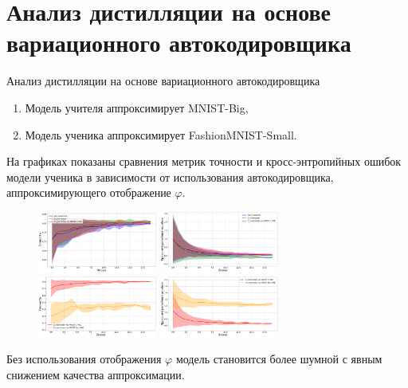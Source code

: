 \documentclass[10pt,pdf,hyperref={unicode}]{beamer}
\begin{document}
\section{Анализ дистилляции на основе вариационного автокодировщика}
\begin{frame}{Анализ дистилляции на основе вариационного автокодировщика}
\justifying
\begin{enumerate}[1)]
    \item Модель учителя аппроксимирует MNIST-Big,
    \item Модель ученика аппроксимирует FashionMNIST-Small.
\end{enumerate}

\par
На графиках показаны сравнения метрик точности и кросс-энтропийных ошибок модели ученика в зависимости от использования автокодировщика, аппроксимирующего отображение $\varphi$.

\begin{figure}[h!]
\includegraphics[width=0.35\textwidth]{results/vae_acc.png}
\includegraphics[width=0.35\textwidth]{results/vae_loss.png}
\includegraphics[width=0.35\textwidth]{results/vae_acc_comparison.png}
\includegraphics[width=0.35\textwidth]{results/vae_loss_comparison.png}
\end{figure}

Без использования отображения $\varphi$ модель становится более шумной с явным снижением качества аппроксимации.

\end{frame}
\end{document}
